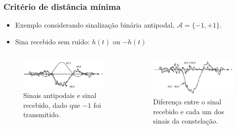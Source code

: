 \begin{frame}
	\frametitle{Critério de distância mínima}

	\begin{itemize}
	    \item Exemplo considerando sinalização binária antipodal, $\mathcal{A} = \{ -1, +1 \}$. 
	    \item Sina recebido sem ruído: $h(t)$ ou $-h(t)$
	\end{itemize}	
	\begin{columns}
		\begin{column}{0.5\textwidth}
		    \begin{figure}[t]	
		      \begin{center}
			\includegraphics[width=\columnwidth]{figs/pam_23}
		      \end{center}\vspace{0.5cm}
		      \caption{Sinais antipodais e sinal recebido, dado que $-1$ foi transmitido.}
		    \end{figure}
		\end{column}
		\begin{column}{0.5\textwidth}
		     \begin{figure}[t]	
		      \begin{center}
			\includegraphics[width=\columnwidth]{figs/pam_24}
		      \end{center}
		      \caption{Diferença entre o sinal recebido e cada um dos sinais da constelação.}
		    \end{figure}
		\end{column}
	\end{columns}
	
\end{frame}

